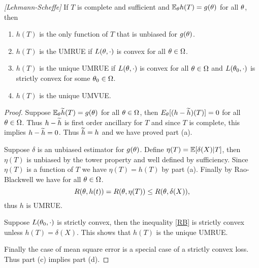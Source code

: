 \begin{thrm}
    \emph{[Lehmann-Scheffe]} If $T$ is complete and sufficient and ${\mathbb{E}}_{\theta} h(T) = g({\theta})$ for all ${\theta}$, then 
    \begin{enumerate}
        \item $h(T)$ is the only function of $T$ that is unbiased for $g({\theta})$.
        \item $h(T)$ is the UMRUE if $L({\theta},\cdot)$ is convex for all ${\theta}\in {{\Omega}}$.
        \item $h(T)$ is the unique UMRUE if $L({\theta},\cdot)$ is convex for all ${\theta}\in {{\Omega}}$ and $L({\theta}_0,\cdot)$ is strictly convex for some ${\theta}_0 \in {{\Omega}}$. 
        \item $h(T)$ is the unique UMVUE.
    \end{enumerate}
\end{thrm}
\begin{proof}
    Suppose ${\mathbb{E}}_{\theta} \widetilde{h}(T) = g({\theta})$ for all ${\theta} \in {{\Omega}}$, then $E_{\theta}[(h-\widetilde{h})(T)] = 0$ for all ${\theta} \in {{\Omega}}$. Thus $h - \widetilde{h}$ is first order ancillary for $T$ and since $T$ is complete, this implies $h-\widetilde{h}=0$. Thus $\widetilde{h}=h$ and we have proved part (a).

    Suppose $\delta$ is an unbiased estimator for $g({\theta})$. Define $\eta(T) = {\mathbb{E}}[\delta(X)|T]$, then $\eta(T)$ is unbiased by the tower property and well defined by sufficiency. Since $\eta(T)$ is a function of $T$ we have $\eta(T) = h(T)$ by part (a). Finally by Rao-Blackwell we have for all ${\theta} \in {{\Omega}}$.
    \begin{equation}\label{RB}
        R({\theta}, h(t)) = R({\theta}, \eta(T)) \le R({\theta}, \delta(X)), 
    \end{equation}
    thus $h$ is UMRUE.

    Suppose $L({\theta}_0,\cdot)$ is strictly convex, then the inequality \eqref{RB} is strictly convex unless $h(T) = \delta(X)$. This shows that $h(T)$ is the unique UMRUE.

    Finally the case of mean square error is a special case of a strictly convex loss. Thus part (c) implies part (d).
\end{proof}
